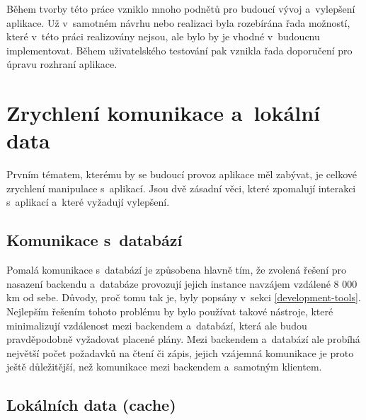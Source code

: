 Během tvorby této práce vzniklo mnoho podnětů pro budoucí vývoj a~vylepšení aplikace. Už v~samotném návrhu nebo realizaci byla rozebírána řada možností, které v~této práci realizovány nejsou, ale bylo by je vhodné v~budoucnu implementovat. Během uživatelského testování pak vznikla řada doporučení pro úpravu rozhraní aplikace.

\section{Zrychlení komunikace a~lokální data}

Prvním tématem, kterému by se budoucí provoz aplikace měl zabývat, je celkové zrychlení manipulace s~aplikací. Jsou dvě zásadní věci, které zpomalují interakci s~aplikací a~které vyžadují vylepšení.

\subsection{Komunikace s~databází}

Pomalá komunikace s~databází je způsobena hlavně tím, že zvolená řešení pro nasazení backendu a~databáze provozují jejich instance navzájem vzdálené 8 000 km od sebe. Důvody, proč tomu tak je, byly popsány v~sekci \ref{development-tools}. Nejlepším řešením tohoto problému by bylo používat takové nástroje, které minimalizují vzdálenost mezi backendem a~databází, která ale budou pravděpodobně vyžadovat placené plány. Mezi backendem a~databází ale probíhá největší počet požadavků na čtení či zápis, jejich vzájemná komunikace je proto ještě důležitější, než komunikace mezi backendem a~samotným klientem.

\subsection{Lokálních data (cache)}

